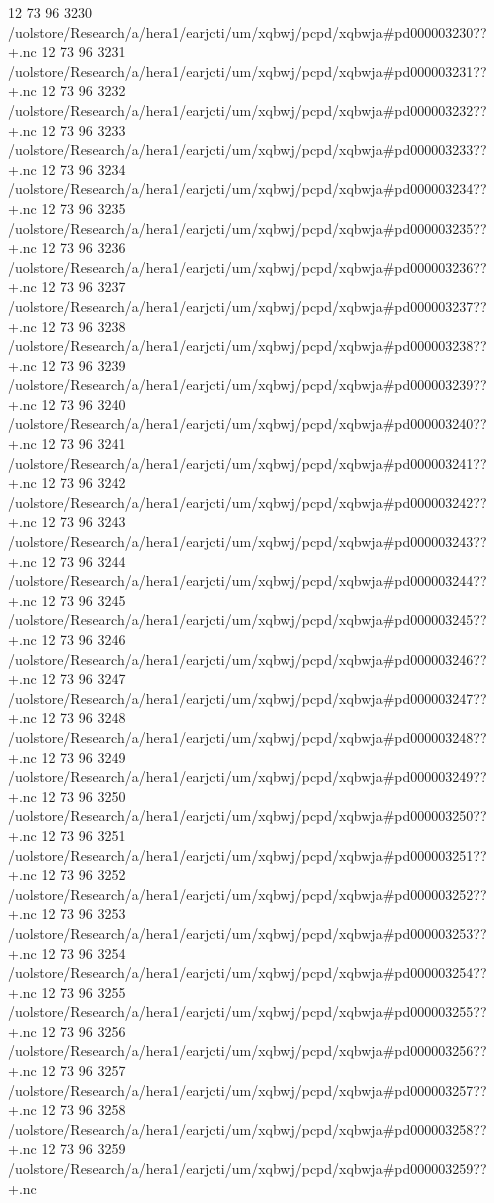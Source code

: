 12 73 96
3230
/uolstore/Research/a/hera1/earjcti/um/xqbwj/pcpd/xqbwja#pd000003230??+.nc
12 73 96
3231
/uolstore/Research/a/hera1/earjcti/um/xqbwj/pcpd/xqbwja#pd000003231??+.nc
12 73 96
3232
/uolstore/Research/a/hera1/earjcti/um/xqbwj/pcpd/xqbwja#pd000003232??+.nc
12 73 96
3233
/uolstore/Research/a/hera1/earjcti/um/xqbwj/pcpd/xqbwja#pd000003233??+.nc
12 73 96
3234
/uolstore/Research/a/hera1/earjcti/um/xqbwj/pcpd/xqbwja#pd000003234??+.nc
12 73 96
3235
/uolstore/Research/a/hera1/earjcti/um/xqbwj/pcpd/xqbwja#pd000003235??+.nc
12 73 96
3236
/uolstore/Research/a/hera1/earjcti/um/xqbwj/pcpd/xqbwja#pd000003236??+.nc
12 73 96
3237
/uolstore/Research/a/hera1/earjcti/um/xqbwj/pcpd/xqbwja#pd000003237??+.nc
12 73 96
3238
/uolstore/Research/a/hera1/earjcti/um/xqbwj/pcpd/xqbwja#pd000003238??+.nc
12 73 96
3239
/uolstore/Research/a/hera1/earjcti/um/xqbwj/pcpd/xqbwja#pd000003239??+.nc
12 73 96
3240
/uolstore/Research/a/hera1/earjcti/um/xqbwj/pcpd/xqbwja#pd000003240??+.nc
12 73 96
3241
/uolstore/Research/a/hera1/earjcti/um/xqbwj/pcpd/xqbwja#pd000003241??+.nc
12 73 96
3242
/uolstore/Research/a/hera1/earjcti/um/xqbwj/pcpd/xqbwja#pd000003242??+.nc
12 73 96
3243
/uolstore/Research/a/hera1/earjcti/um/xqbwj/pcpd/xqbwja#pd000003243??+.nc
12 73 96
3244
/uolstore/Research/a/hera1/earjcti/um/xqbwj/pcpd/xqbwja#pd000003244??+.nc
12 73 96
3245
/uolstore/Research/a/hera1/earjcti/um/xqbwj/pcpd/xqbwja#pd000003245??+.nc
12 73 96
3246
/uolstore/Research/a/hera1/earjcti/um/xqbwj/pcpd/xqbwja#pd000003246??+.nc
12 73 96
3247
/uolstore/Research/a/hera1/earjcti/um/xqbwj/pcpd/xqbwja#pd000003247??+.nc
12 73 96
3248
/uolstore/Research/a/hera1/earjcti/um/xqbwj/pcpd/xqbwja#pd000003248??+.nc
12 73 96
3249
/uolstore/Research/a/hera1/earjcti/um/xqbwj/pcpd/xqbwja#pd000003249??+.nc
12 73 96
3250
/uolstore/Research/a/hera1/earjcti/um/xqbwj/pcpd/xqbwja#pd000003250??+.nc
12 73 96
3251
/uolstore/Research/a/hera1/earjcti/um/xqbwj/pcpd/xqbwja#pd000003251??+.nc
12 73 96
3252
/uolstore/Research/a/hera1/earjcti/um/xqbwj/pcpd/xqbwja#pd000003252??+.nc
12 73 96
3253
/uolstore/Research/a/hera1/earjcti/um/xqbwj/pcpd/xqbwja#pd000003253??+.nc
12 73 96
3254
/uolstore/Research/a/hera1/earjcti/um/xqbwj/pcpd/xqbwja#pd000003254??+.nc
12 73 96
3255
/uolstore/Research/a/hera1/earjcti/um/xqbwj/pcpd/xqbwja#pd000003255??+.nc
12 73 96
3256
/uolstore/Research/a/hera1/earjcti/um/xqbwj/pcpd/xqbwja#pd000003256??+.nc
12 73 96
3257
/uolstore/Research/a/hera1/earjcti/um/xqbwj/pcpd/xqbwja#pd000003257??+.nc
12 73 96
3258
/uolstore/Research/a/hera1/earjcti/um/xqbwj/pcpd/xqbwja#pd000003258??+.nc
12 73 96
3259
/uolstore/Research/a/hera1/earjcti/um/xqbwj/pcpd/xqbwja#pd000003259??+.nc
